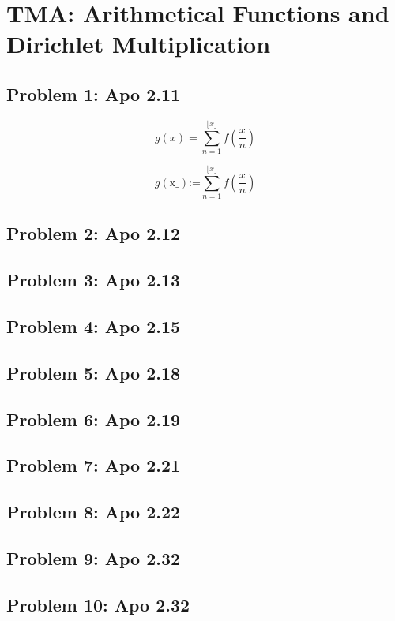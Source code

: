 \section{TMA: Arithmetical Functions and Dirichlet Multiplication}

\subsection[Problem 1]{Problem 1: Apo 2.11}

$$
g(x)=\sum _{n=1}^{\lfloor x\rfloor } f\left(\frac{x}{n}\right)
$$

$$
g(\text{x$\_$})\text{:=}\sum _{n=1}^{\lfloor x\rfloor } f\left(\frac{x}{n}\right)
$$

\subsection[Problem 2]{Problem 2: Apo 2.12}

\subsection[Problem 3]{Problem 3: Apo 2.13}

\subsection[Problem 4]{Problem 4: Apo 2.15}

\subsection[Problem 5]{Problem 5: Apo 2.18}

\subsection[Problem 6]{Problem 6: Apo 2.19}

\subsection[Problem 7]{Problem 7: Apo 2.21}

\subsection[Problem 8]{Problem 8: Apo 2.22}

\subsection[Problem 9]{Problem 9: Apo 2.32}

\subsection[Problem 10]{Problem 10: Apo 2.32}